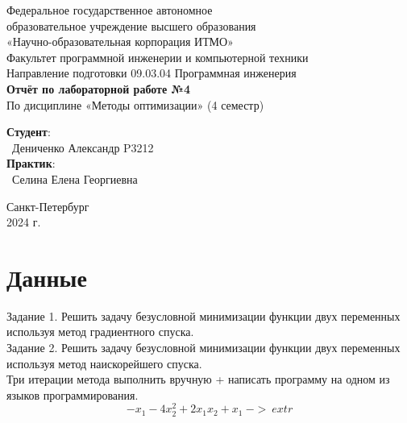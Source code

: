 \documentclass{article}
\begin{document}
\begin{center}
    \Large
    Федеральное государственное автономное \\
    образовательное учреждение высшего образования \\ 
    «Научно-образовательная корпорация ИТМО»\\
    \vspace{0.5cm}
    \large
    Факультет программной инженерии и компьютерной техники \\
    Направление подготовки 09.03.04 Программная инженерия \\
    \vspace{1cm}
    \Large
    \textbf{Отчёт по лабораторной работе №4} \\
    По дисциплине «Методы оптимизации» (4 семестр)\\
    \large
    \vspace{8cm}

    \begin{minipage}{.33\textwidth}
    \end{minipage}
    \hfill
    \begin{minipage}{.4\textwidth}
    
        \textbf{Студент}: \vspace{.1cm} \\
        \ Дениченко Александр P3212\\
        \textbf{Практик}:  \\
        \ Селина Елена Георгиевна
    \end{minipage}
    \vfill
Санкт-Петербург\\ 2024 г.
\end{center}
\pagestyle{empty}
\newpage
\pagestyle{plain}

\section*{Данные}
Задание 1. Решить задачу безусловной минимизации функции двух переменных используя метод градиентного спуска.\\
Задание 2. Решить задачу безусловной минимизации функции двух переменных используя метод наискорейшего спуска.\\
Три итерации метода выполнить вручную + написать программу на одном из языков программирования.\\
\[-x_1-4x_2^2+2x_1x_2+x_1 \ ->\ extr\]
\end{document}
